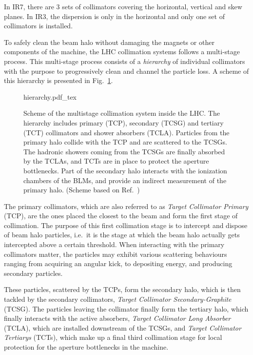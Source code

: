 In IR7, there are 3 sets of collimators covering the horizontal, vertical and skew planes. In IR3, the dispersion is only in the horizontal and only one set of collimators is installed.

To safely clean the beam halo without damaging the magnets or other components of the machine, the LHC collimation systems follows a multi-stage process. This multi-stage process consists of a \textit{hierarchy} of individual collimators with the purpose to progressively clean and channel the particle loss. A scheme of this hierarchy is presented in Fig.~\ref{fig:collimator_hierarchy}.

\begin{figure}[htp]
    \centering
    \def\svgwidth{1.0\columnwidth}
    {hierarchy.pdf_tex}
    \caption{Scheme of the multistage collimation system inside the LHC. The hierarchy includes primary (TCP), secondary (TCSG) and tertiary (TCT) collimators and shower absorbers (TCLA). Particles from the primary halo collide with the TCP and are scattered to the TCSGs. The hadronic showers coming from the TCSGs are finally absorbed by the TCLAs, and TCTs are in place to protect the aperture bottlenecks. Part of the secondary halo interacts with the ionization chambers of the BLMs, and provide an indirect measurement of the primary halo. (Scheme based on Ref.~\cite{Hermes:2241364})}
    \label{fig:collimator_hierarchy}
\end{figure}

The primary collimators, which are also referred to as \textit{Target Collimator Primary} (TCP), are the ones placed the closest to the beam and form the first stage of collimation. The purpose of this first collimation stage is to intercept and dispose of beam halo particles, i.e.\ it is the stage at which the beam halo actually gets intercepted above a certain threshold. When interacting with the primary collimators matter, the particles may exhibit various scattering behaviours ranging from acquiring an angular kick, to depositing energy, and producing secondary particles. 

These particles, scattered by the TCPs, form the secondary halo, which is then tackled by the secondary collimators, \textit{Target Collimator Secondary-Graphite} (TCSG). The particles leaving the collimator finally form the tertiary halo, which finally interacts with the active absorbers, \textit{Target Collimator Long Absorber} (TCLA), which are installed downstream of the TCSGs, and \textit{Target Collimator Tertiarys} (TCTs), which make up a final third collimation stage for local protection for the aperture bottlenecks in the machine.

